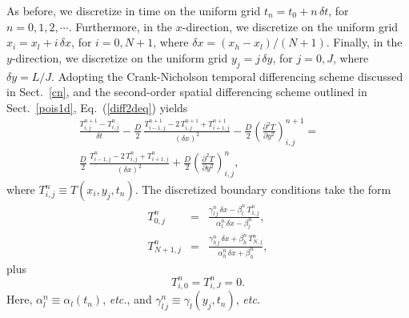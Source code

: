 As before, we discretize in time on the uniform grid $t_n=t_0+n\,\delta t$, for $n=0,1,2,\cdots$.
Furthermore, in the $x$-direction, we discretize on the uniform grid $x_i = x_l + i\,\delta x$, for
$i=0,N+1$, where $\delta x = (x_h-x_l)/(N+1)$. Finally, in the $y$-direction, we discretize
on the uniform grid $y_j = j\,\delta y$, for $j=0,J$, where $\delta y = L/J$. 
Adopting the Crank-Nicholson temporal differencing scheme discussed in Sect.~\ref{cn}, and
the second-order spatial differencing scheme outlined in
Sect.~\ref{pois1d}, Eq.~(\ref{diff2deq}) yields
\begin{eqnarray}\label{edisc}
\frac{T_{i,j}^{n+1}-T_{i,j}^n}{\delta t} - \frac{D}{2}\,
\frac{T_{i-1,j}^{n+1}-2\,T_{i,j}^{n+1}+T_{i+1,j}^{n+1}}{(\delta x)^2}
- \frac{D}{2}\left(\frac{\partial^2 T}{\partial y^2}\right)_{i,j}^{n+1}=&&\nonumber\\[0.5ex]
\frac{D}{2}\,
\frac{T_{i-1,j}^{n}-2\,T_{i,j}^{n}+T_{i+1,j}^{n}}{(\delta x)^2} +
\frac{D}{2}\left(\frac{\partial^2 T}{\partial y^2}\right)_{i,j}^{n},&&
\end{eqnarray}
where $T_{i,j}^n\equiv T(x_i,y_j,t_n)$. The discretized boundary conditions
take the form
\begin{eqnarray}\label{bcxdir}
T_{0,j}^n &=& \frac{\gamma_{l\,j}^n\,\delta x-\beta_l^n\,T_{1,j}^n}{\alpha_l^n\,\delta x -\beta_l^n},\\[0.5ex]
T_{N+1,j}^n &=& \frac{\gamma_{h\,j}^n\,\delta x + \beta_h^n\,T_{N,j}^n}{\alpha_h^n\,\delta x +\beta_h^n},
\label{bcxdir1}
\end{eqnarray}
plus
\begin{equation}\label{bcydir}
T_{i,0}^n = T_{i,J}^n = 0.
\end{equation}
Here, $\alpha_l^n\equiv \alpha_l(t_n)$, {\em etc.}, and $\gamma_{l\,j}^n\equiv
\gamma_l(y_j,t_n)$, {\em etc.}

